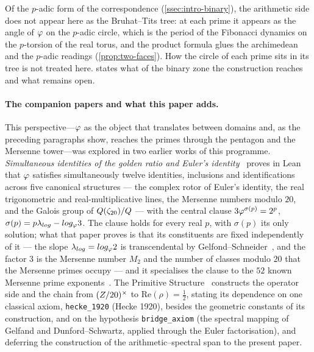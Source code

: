 Of the $p$-adic form of the correspondence (\cref{ssec:intro-binary}), the arithmetic side
does not appear here as the Bruhat--Tits tree: at each prime it appears as the angle of $\varphi$ on the $p$-adic circle, which is the
period of the Fibonacci dynamics on the $p$-torsion of the real torus, and the product formula glues the
archimedean and the $p$-adic readings (\cref{prop:two-faces}).  How the circle of each prime sits in its tree is not
treated here.   states what of the binary zone the construction reaches and what remains open.

\paragraph{The companion papers and what this paper adds.}
This perspective---$\varphi$ as the object that translates between domains and, as the preceding paragraphs show,
reaches the primes through the pentagon and the Mersenne tower---was explored in
two earlier works of this programme.  \emph{Simultaneous identities of the golden
ratio and Euler's identity}~\cite{gonzalez26mersenne} proves in Lean that $\varphi$
satisfies simultaneously twelve identities, inclusions and identifications across
five canonical structures --- the complex rotor of Euler's identity, the real
trigonometric and real-multiplicative lines, the Mersenne numbers modulo $20$, and
the Galois group of $Q(\zeta_{20})/Q$ --- with the central clause
$3\varphi^{\sigma(p)}=2^p$, $\sigma(p)=p\lambda_{log}-log_\varphi3$.  The clause holds for every real $p$, with $\sigma(p)$
its only solution; what that paper proves is that its constituents are fixed independently of it --- the slope
$\lambda_{log}=log_\varphi2$ is transcendental by Gelfond--Schneider~\cite{gelfond34,schneider35}, and the factor $3$ is the
Mersenne number $M_2$ and the number of classes modulo $20$ that the Mersenne primes occupy --- and it specialises
the clause to the $52$ known Mersenne prime exponents~\cite{gimps}.  The Primitive Structure~\cite{gonzalez25hp} constructs the operator side and the chain from $(Z/20)^{\times}$
to $\mathrm{Re}(\rho)=\tfrac12$, stating its dependence on one classical axiom,
\texttt{hecke\_1920} (Hecke 1920), besides the geometric constants of its
construction, and on the hypothesis \texttt{bridge\_axiom} (the spectral mapping
of Gelfand and Dunford--Schwartz, applied through the Euler factorisation), and
deferring the construction of the arithmetic--spectral span to the present paper.


